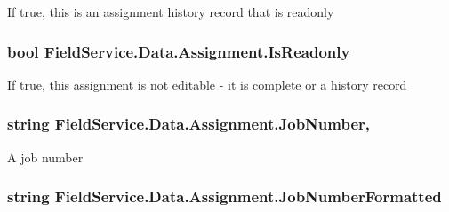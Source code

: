 If true, this is an assignment history record that is readonly 

\hypertarget{class_field_service_1_1_data_1_1_assignment_a62ea5221113e69d186cd59f88c247d04}{
\subsubsection[{Is\+Readonly}]{\setlength{\rightskip}{0pt plus 5cm}bool Field\+Service.\+Data.\+Assignment.\+Is\+Readonly\hspace{0.3cm}{\ttfamily [get]}}}\label{class_field_service_1_1_data_1_1_assignment_a62ea5221113e69d186cd59f88c247d04}


If true, this assignment is not editable -\/ it is complete or a history record 

\hypertarget{class_field_service_1_1_data_1_1_assignment_a61e064d5b34c2e76593ad0afac067527}{
\subsubsection[{Job\+Number}]{\setlength{\rightskip}{0pt plus 5cm}string Field\+Service.\+Data.\+Assignment.\+Job\+Number\hspace{0.3cm}{\ttfamily [get]}, {\ttfamily [set]}}}\label{class_field_service_1_1_data_1_1_assignment_a61e064d5b34c2e76593ad0afac067527}


A job number 

\hypertarget{class_field_service_1_1_data_1_1_assignment_a73c8154ab5178a78917d70350355cdca}{
\subsubsection[{Job\+Number\+Formatted}]{\setlength{\rightskip}{0pt plus 5cm}string Field\+Service.\+Data.\+Assignment.\+Job\+Number\+Formatted\hspace{0.3cm}{\ttfamily [get]}}}\label{class_field_service_1_1_data_1_1_assignment_a73c8154ab5178a78917d70350355cdca}


